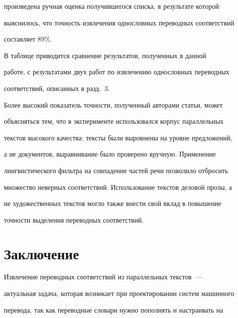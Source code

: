 произведена ручная оценка получившегося списка, в результате которой


выяснилось, что точность извлечения однословных переводных соответствий


составляет 89\%.





  В таблице приводится сравнение результатов, полученных в данной


работе, с результатами двух работ по извлечению однословных переводных


соответствий, описанных в разд.~3.











  Более высокий показатель точности, полученный авторами статьи, может


объясняться тем, что в эксперименте использовался корпус параллельных


текстов высокого качества: тексты были выровнены на уровне предложений,


а не документов, выравнивание было проверено вручную. Применение


лингвистического фильтра на совпадение частей речи позволило отбросить


множество неверных соответствий. Использование текстов деловой прозы, а


не художественных текстов могло также внести свой вклад в повышение


точности выделения переводных соответствий.





\vspace*{-2pt}





\section{Заключение}





  Извлечение переводных соответствий из параллельных текстов~---


актуальная задача, которая возникает при проектировании систем машинного


перевода, так как переводные словари нужно пополнять и настраивать на


